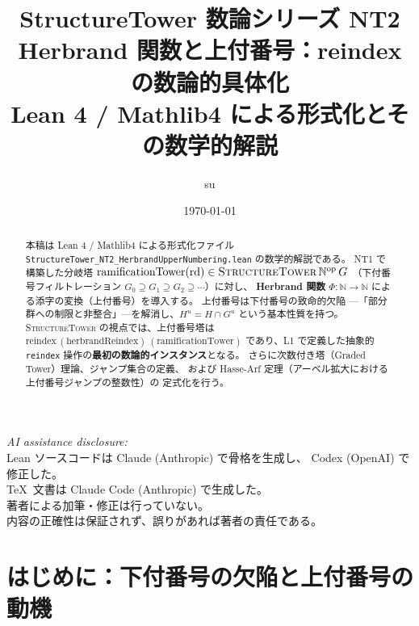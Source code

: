\documentclass[a4paper,11pt]{ltjsarticle}
\theoremstyle{definition}
\theoremstyle{plain}
\theoremstyle{remark}
\begin{document}
\title{%
  {\LARGE\sffamily\bfseries StructureTower 数論シリーズ NT2}\\[0.5em]
  {\large\sffamily Herbrand 関数と上付番号：reindex の数論的具体化}\\[0.3em]
  {\normalsize\sffamily Lean 4 / Mathlib4 による形式化とその数学的解説}%
}
\author{su}
\date{\today}
\maketitle
\thispagestyle{fancy}

\begin{center}
\small
\textit{AI assistance disclosure:}\\
Lean ソースコードは Claude (Anthropic) で骨格を生成し、
Codex (OpenAI) で修正した。\\
\TeX\ 文書は Claude Code (Anthropic) で生成した。\\
著者による加筆・修正は行っていない。\\
内容の正確性は保証されず、誤りがあれば著者の責任である。
\end{center}

\vspace{1em}

\begin{abstract}
本稿は Lean 4 / Mathlib4 による形式化ファイル
\texttt{StructureTower\_NT2\_HerbrandUpperNumbering.lean} の数学的解説である。
NT1 で構築した分岐塔 $\mathrm{ramificationTower}(\mathrm{rd}) \in
\textsc{StructureTower}\,\mathbb{N}^{\mathrm{op}}\,G$
（下付番号フィルトレーション $G_0 \supseteq G_1 \supseteq G_2 \supseteq \cdots$）に対し、
\textbf{Herbrand 関数} $\varPhi\colon \mathbb{N} \to \mathbb{N}$
による添字の変換（上付番号）を導入する。
上付番号は下付番号の致命的欠陥
—「部分群への制限と非整合」—を解消し、$H^u = H \cap G^u$ という基本性質を持つ。
\textsc{StructureTower} の視点では、上付番号塔は
$\mathrm{reindex}\,(\text{herbrandReindex})\,(\mathrm{ramificationTower})$
であり、L1 で定義した抽象的 \texttt{reindex} 操作の\textbf{最初の数論的インスタンス}となる。
さらに次数付き塔（Graded Tower）理論、ジャンプ集合の定義、
および Hasse-Arf 定理（アーベル拡大における上付番号ジャンプの整数性）の
定式化を行う。
\end{abstract}

\tableofcontents
\newpage

\section{はじめに：下付番号の欠陥と上付番号の動機}
\end{document}
